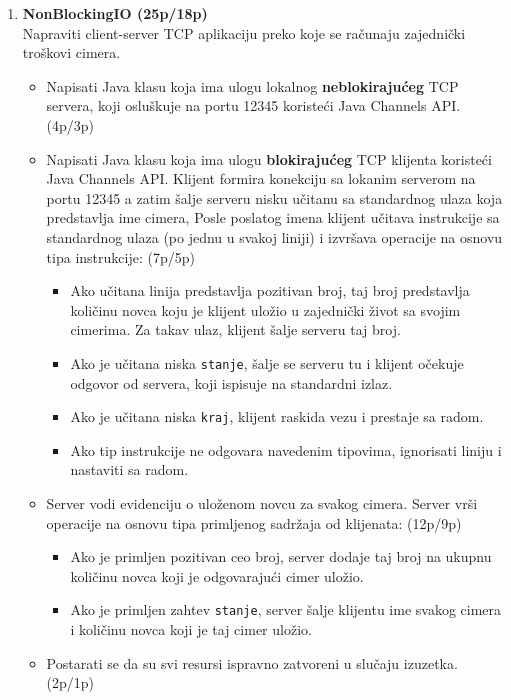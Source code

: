 \documentclass[]{article}
\begin{document}
\begin{enumerate}
\item \textbf{NonBlockingIO (25p/18p)}
\\Napraviti client-server TCP aplikaciju preko koje se ra\v{c}unaju zajednički troškovi cimera.
\begin{itemize}
    \item Napisati Java klasu koja ima ulogu lokalnog \textbf{neblokiraju\'c{}eg} TCP servera, koji oslu\v{s}kuje na portu 12345 koriste\'c{}i Java Channels API. \hfill (4p/3p)
    \item Napisati Java klasu koja ima ulogu \textbf{blokiraju\'c{}eg} TCP klijenta koriste\'c{}i Java Channels API. Klijent formira konekciju sa lokanim serverom na portu 12345 a zatim \v{s}alje serveru nisku učitanu sa standardnog ulaza koja predstavlja ime cimera, Posle poslatog imena klijent u\v{c}itava instrukcije sa standardnog ulaza (po jednu u svakoj liniji) i izvr\v{s}ava operacije na osnovu tipa instrukcije: \hfill (7p/5p)
    \begin{itemize}
        \item Ako u\v{c}itana linija predstavlja pozitivan broj, taj broj predstavlja količinu novca koju je klijent uložio u zajednički život sa svojim cimerima. Za takav ulaz, klijent šalje serveru taj broj.
        \item Ako je u\v{c}itana niska \texttt{stanje}, šalje se serveru tu i klijent očekuje odgovor od servera, koji ispisuje na standardni izlaz.  
        \item Ako je u\v{c}itana niska \texttt{kraj}, klijent raskida vezu i prestaje sa radom.  
        \item Ako tip instrukcije ne odgovara navedenim tipovima, ignorisati liniju i nastaviti sa radom.  
    \end{itemize} 
    \item Server vodi evidenciju o uloženom novcu za svakog cimera. Server vr\v{s}i operacije na osnovu tipa primljenog sadr\v{z}aja od klijenata: \hfill (12p/9p)
    \begin{itemize}
        \item Ako je primljen pozitivan ceo broj, server dodaje taj broj na ukupnu količinu novca koji je odgovarajući cimer uložio.
        \item Ako je primljen zahtev \texttt{stanje}, server šalje klijentu ime svakog cimera i količinu novca koji je taj cimer uložio. 
    \end{itemize} 
    \item Postarati se da su svi resursi ispravno zatvoreni u slu\v{c}aju izuzetka. \hfill (2p/1p)
  \end{itemize}

\end{enumerate}
\end{document}
